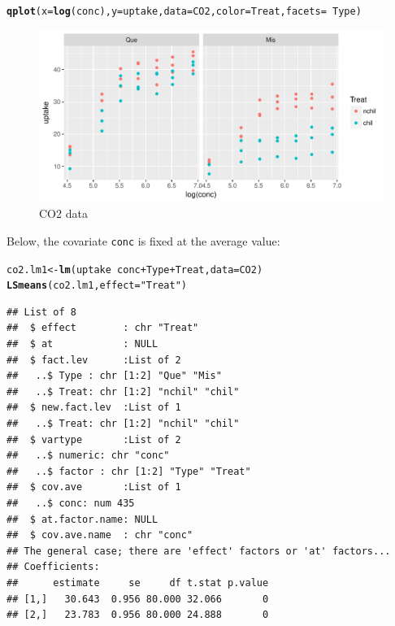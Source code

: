 \documentclass[10pt]{article}\usepackage[]{graphicx}\usepackage[]{color}
\makeatletter
\def\maxwidth{ %
  \ifdim\Gin@nat@width>\linewidth
    \linewidth
  \else
    \Gin@nat@width
  \fi
}
\newcommand{\hlstr}[1]{\textcolor[rgb]{0.192,0.494,0.8}{#1}}%
\newcommand{\hlopt}[1]{\textcolor[rgb]{0,0,0}{#1}}%
\newcommand{\hlstd}[1]{\textcolor[rgb]{0.345,0.345,0.345}{#1}}%
\newcommand{\hlkwb}[1]{\textcolor[rgb]{0.69,0.353,0.396}{#1}}%
\newcommand{\hlkwc}[1]{\textcolor[rgb]{0.333,0.667,0.333}{#1}}%
\newcommand{\hlkwd}[1]{\textcolor[rgb]{0.737,0.353,0.396}{\textbf{#1}}}%
\newenvironment{kframe}{%
 \def\at@end@of@kframe{}%
 \ifinner\ifhmode%
  \def\at@end@of@kframe{\end{minipage}}%
  \begin{minipage}{\columnwidth}%
 \fi\fi%
 \def\FrameCommand##1{\hskip\@totalleftmargin \hskip-\fboxsep
 \colorbox{shadecolor}{##1}\hskip-\fboxsep
     \hskip-\linewidth \hskip-\@totalleftmargin \hskip\columnwidth}%
 \MakeFramed {\advance\hsize-\width
   \@totalleftmargin\z@ \linewidth\hsize
   \@setminipage}}%
 {\par\unskip\endMakeFramed%
 \at@end@of@kframe}
\newenvironment{knitrout}{}{} %
\def\code#1{\texttt{#1}}
\makeatother
\begin{document}
\begin{knitrout}
\color{fgcolor}\begin{kframe}
\begin{alltt}
\hlkwd{qplot}\hlstd{(}\hlkwc{x}\hlstd{=}\hlkwd{log}\hlstd{(conc),} \hlkwc{y}\hlstd{=uptake,} \hlkwc{data}\hlstd{=CO2,} \hlkwc{color}\hlstd{=Treat,} \hlkwc{facets}\hlstd{=}\hlopt{~}\hlstd{Type)}
\end{alltt}
\end{kframe}\begin{figure}
\includegraphics[width=\maxwidth]{figures/LSmeansco2-fig-1} \caption[CO2 data]{CO2 data}\label{fig:co2-fig}
\end{figure}


\end{knitrout}

Below, the covariate \code{conc} is fixed at the average value:
\begin{knitrout}
\color{fgcolor}\begin{kframe}
\begin{alltt}
\hlstd{co2.lm1} \hlkwb{<-} \hlkwd{lm}\hlstd{(uptake} \hlopt{~} \hlstd{conc} \hlopt{+} \hlstd{Type} \hlopt{+} \hlstd{Treat,} \hlkwc{data}\hlstd{=CO2)}
\hlkwd{LSmeans}\hlstd{(co2.lm1,} \hlkwc{effect}\hlstd{=}\hlstr{"Treat"}\hlstd{)}
\end{alltt}
\begin{verbatim}
## List of 8
##  $ effect        : chr "Treat"
##  $ at            : NULL
##  $ fact.lev      :List of 2
##   ..$ Type : chr [1:2] "Que" "Mis"
##   ..$ Treat: chr [1:2] "nchil" "chil"
##  $ new.fact.lev  :List of 1
##   ..$ Treat: chr [1:2] "nchil" "chil"
##  $ vartype       :List of 2
##   ..$ numeric: chr "conc"
##   ..$ factor : chr [1:2] "Type" "Treat"
##  $ cov.ave       :List of 1
##   ..$ conc: num 435
##  $ at.factor.name: NULL
##  $ cov.ave.name  : chr "conc"
## The general case; there are 'effect' factors or 'at' factors...
## Coefficients:
##      estimate     se     df t.stat p.value
## [1,]   30.643  0.956 80.000 32.066       0
## [2,]   23.783  0.956 80.000 24.888       0
\end{verbatim}
\end{kframe}
\end{knitrout}
\end{document}
